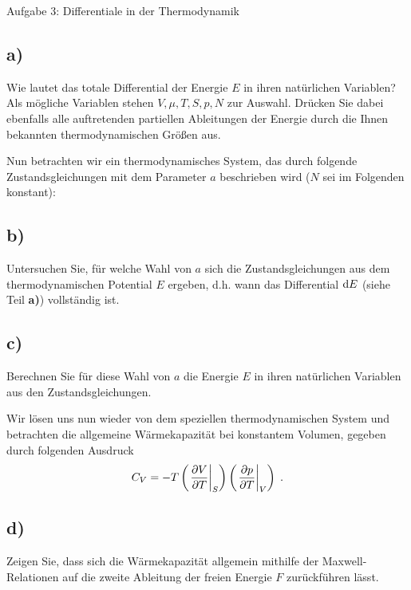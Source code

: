 \begin{aufgabe}{Aufgabe 3: Differentiale in der Thermodynamik}
    \subsection{a)}
    Wie lautet das totale Differential der Energie $E$ in ihren natürlichen Variablen?
    Als mögliche Variablen stehen $V, \mu, T, S, p, N$ zur Auswahl.
    Drücken Sie dabei ebenfalls alle auftretenden partiellen Ableitungen der Energie durch die Ihnen bekannten thermodynamischen Größen aus.


    Nun betrachten wir ein thermodynamisches System, das durch folgende Zustandsgleichungen mit dem Parameter $a$ beschrieben wird ($N$ sei im Folgenden konstant):

    \subsection{b)}
    Untersuchen Sie, für welche Wahl von $a$ sich die Zustandsgleichungen aus dem thermodynamischen Potential $E$ ergeben, d.h. wann das Differential $\mathrm{d} E$ (siehe Teil \textbf{a)}) vollständig ist.

    \subsection{c)}
    Berechnen Sie für diese Wahl von $a$ die Energie $E$ in ihren natürlichen Variablen aus den Zustandsgleichungen.


    Wir lösen uns nun wieder von dem speziellen thermodynamischen System und betrachten die allgemeine Wärmekapazität bei konstantem Volumen, gegeben durch folgenden Ausdruck
    \[
        C_V = -T \left(\left.\frac{\partial V}{\partial T}\right\rvert_{S}\right) \left(\left.\frac{\partial p}{\partial T}\right\rvert_{V}\right) \;.
    \]

    \subsection{d)}
    Zeigen Sie, dass sich die Wärmekapazität allgemein mithilfe der Maxwell-Relationen auf die zweite Ableitung der freien Energie $F$ zurückführen lässt.

\end{aufgabe}

